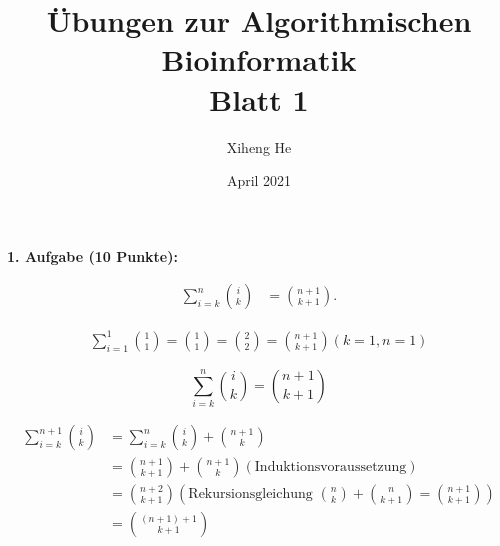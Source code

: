 \documentclass{article}
\title{Übungen zur Algorithmischen Bioinformatik \\
Blatt 1}
\author{Xiheng He}
\date{April 2021}
\begin{document}
\maketitle
\begin{flushleft}
\textbf{1. Aufgabe (10 Punkte):}\par
{}
\begin{equation*}
    \begin{aligned}
        \sum_{i=k}^{n}\binom{i}{k} &= \binom{n+1}{k+1}.
    \end{aligned}
\end{equation*}
\par
{}
\begin{equation*}
    \begin{aligned}
        \sum_{i=1}^1\binom{1}{1} = \binom{1}{1} = \binom{2}{2} = \binom{n+1}{k+1} \left(k=1, n=1\right)
    \end{aligned}
\end{equation*}
\par
{}
\begin{equation*}
    \sum_{i=k}^n\binom{i}{k} = \binom{n+1}{k+1}
\end{equation*}
\par
{}\par
\begin{equation*}
    \begin{aligned}
        \sum_{i=k}^{n+1}\binom{i}{k} &= \sum_{i=k}^n\binom{i}{k} + \binom{n+1}{k}\\
        &= \binom{n+1}{k+1} + \binom{n+1}{k} (\text{Induktionsvoraussetzung})\\
        &= \binom{n+2}{k+1} (\text{Rekursionsgleichung $\binom{n}{k}+\binom{n}{k+1}=\binom{n+1}{k+1}$})\\
        &= \binom{(n+1)+1}{k+1}
    \end{aligned}
\end{equation*}


\end{flushleft}
\end{document}
